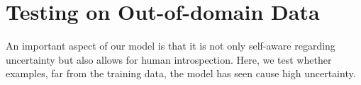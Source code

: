 \documentclass[a4paper,cleardoubleempty,BCOR1cm, 11pt]{report}
\begin{document}
\section{Testing on Out-of-domain Data}\label{sec:zero_shot}
An important aspect of our model is that it is not only self-aware regarding uncertainty but also allows for human introspection. Here, we test whether examples, far from the training data, the model has seen cause high uncertainty.
\end{document}
